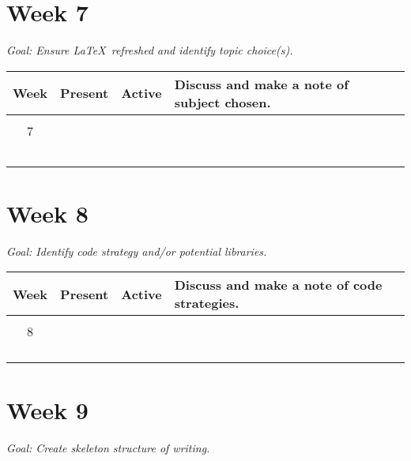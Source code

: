 \documentclass[12pt]{article}
\begin{document}
\section*{Week 7}
\centering\small{\textit{Goal: Ensure \LaTeX\ refreshed and identify topic choice(s).}}

\begin{center}
	\begin{tabular}{c|l|l|p{}}
		\toprule
		Week        & Present & Active & Discuss and make a note of subject chosen.\\
		\midrule
		            &         &        & \\
		7           &         &        & \\
		            &         &        & \\
		            &         &        & \\
		            &         &        & \\
		            &         &        & \\
		            &         &        & \\
	\end{tabular}
\end{center}

\newpage

\section*{Week 8}
\centering\small{\textit{Goal: Identify code strategy and/or potential libraries.}}

\begin{center}
	\begin{tabular}{c|l|l|p{}}
		\toprule
		Week        & Present & Active & Discuss and make a note of code strategies.\\
		\midrule
		            &         &        & \\
		8           &         &        & \\
		            &         &        & \\
		            &         &        & \\
		            &         &        & \\
		            &         &        & \\
	\end{tabular}
\end{center}

\section*{Week 9}
\centering\small{\textit{Goal: Create skeleton structure of writing.}}
\end{document}
